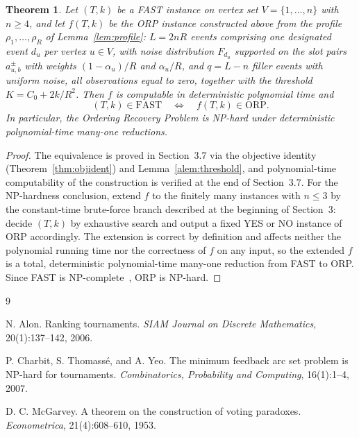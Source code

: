 \documentclass[11pt]{article}
\newtheorem{theorem}{Theorem}
\begin{document}
\begin{theorem}
Let $(T,k)$ be a FAST instance on vertex set $V=\{1,\ldots,n\}$ with $n\ge 4$, and let $f(T,k)$ be the ORP instance constructed above from the profile $\rho_1,\ldots,\rho_R$ of Lemma~\ref{lem:profile}: $L=2nR$ events comprising one designated event $d_u$ per vertex $u\in V$, with noise distribution $F_{d_u}$ supported on the slot pairs $a^{\pm}_{u,b}$ with weights $(1-\alpha_u)/R$ and $\alpha_u/R$, and $q=L-n$ filler events with uniform noise, all observations equal to zero, together with the threshold $K=C_0+2k/R^2$.  Then $f$ is computable in deterministic polynomial time and
\begin{equation}
  (T,k)\in\mathrm{FAST}
  \quad\Longleftrightarrow\quad
  f(T,k)\in\mathrm{ORP}.
\end{equation}
In particular, the Ordering Recovery Problem is NP-hard under deterministic polynomial-time many-one reductions.
\end{theorem}

\begin{proof}
The equivalence is proved in Section~3.7 via the objective identity (Theorem~\ref{thm:objident}) and Lemma~\ref{alem:threshold}, and polynomial-time computability of the construction is verified at the end of Section~3.7.  For the NP-hardness conclusion, extend $f$ to the finitely many instances with $n\le 3$ by the constant-time brute-force branch described at the beginning of Section~3: decide $(T,k)$ by exhaustive search and output a fixed YES or NO instance of ORP accordingly.  The extension is correct by definition and affects neither the polynomial running time nor the correctness of $f$ on any input, so the extended $f$ is a total, deterministic polynomial-time many-one reduction from FAST to ORP.  Since FAST is NP-complete~\cite{Alon2006,Charbit2007}, ORP is NP-hard.
\end{proof}

\begin{thebibliography}{9}

N. Alon.
\newblock Ranking tournaments.
\newblock \emph{SIAM Journal on Discrete Mathematics}, 20(1):137--142, 2006.

P. Charbit, S. Thomass\'e, and A. Yeo.
\newblock The minimum feedback arc set problem is NP-hard for tournaments.
\newblock \emph{Combinatorics, Probability and Computing}, 16(1):1--4, 2007.

D. C. McGarvey.
\newblock A theorem on the construction of voting paradoxes.
\newblock \emph{Econometrica}, 21(4):608--610, 1953.

\end{thebibliography}
\end{document}
